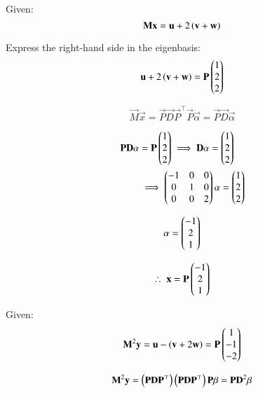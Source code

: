 \documentclass[journal]{IEEEtran}
\begin{document}
Given:
\begin{equation}
\mathbf{M}\mathbf{x} = \mathbf{u} + 2\left(\mathbf{v} + \mathbf{w}\right)
\end{equation}

Express the right-hand side in the eigenbasis:
\begin{equation}
\mathbf{u} + 2\left(\mathbf{v} + \mathbf{w}\right) = \mathbf{P} \begin{pmatrix}1 \\ 2 \\ 2\end{pmatrix}
\end{equation}

\begin{equation}
\vec{M}\vec{x} = \vec{P}\vec{D}\vec{P}^\top \vec{P}\vec{\alpha} = \vec{P}\vec{D}\vec{\alpha}
\end{equation}

\begin{align}
\mathbf{P}\mathbf{D}\mathbf{\alpha} &= \mathbf{P} \begin{pmatrix}1 \\ 2 \\ 2\end{pmatrix} \implies \mathbf{D}\mathbf{\alpha} = \begin{pmatrix}1 \\ 2 \\ 2\end{pmatrix} \\
&\implies \begin{pmatrix}-1 & 0 & 0 \\ 0 & 1 & 0 \\ 0 & 0 & 2\end{pmatrix} \mathbf{\alpha}  = \begin{pmatrix}1 \\ 2 \\ 2\end{pmatrix}
\end{align}

\begin{equation}
\mathbf{\alpha} = \begin{pmatrix}-1 \\ 2 \\ 1\end{pmatrix}
\end{equation}


\begin{equation}
\therefore \; \mathbf{x} = \mathbf{P} \begin{pmatrix}-1 \\ 2 \\ 1\end{pmatrix}
\end{equation}


Given:
\begin{equation}
\mathbf{M}^2\mathbf{y} = \mathbf{u} - \left(\mathbf{v} + 2\mathbf{w}\right) = \mathbf{P} \begin{pmatrix}1 \\ -1 \\ -2\end{pmatrix}
\end{equation}

\begin{equation}
\mathbf{M}^2\mathbf{y} = \left(\mathbf{P}\mathbf{D}\mathbf{P}^\top\right)\left(\mathbf{P}\mathbf{D}\mathbf{P}^\top\right)\mathbf{P}\mathbf{\beta} = \mathbf{P}\mathbf{D}^2\mathbf{\beta}
\end{equation}
\end{document}
